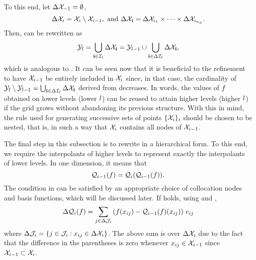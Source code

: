  To this
end, let $\Delta\mathcal{X}_{-1} = \emptyset$,
\[
  \Delta\mathcal{X}_i = \mathcal{X}_i \setminus \mathcal{X}_{i - 1}, \text{ and } \Delta\mathcal{X}_{\mathbf{i}} = \Delta\mathcal{X}_{i_1} \times \cdots \times \Delta\mathcal{X}_{i_{n_\text{d}}}.
\]
Then,  can be rewritten as
\begin{equation} \elab{smolyak-grid-incremental}
  \Y_\l = \bigcup_{\vi \in \lindex_\l} \Delta\X_\vi = \Y_{\l - 1} \cup \bigcup_{\vi \in \Delta\lindex_\l} \Delta\X_\vi,
\end{equation}
which is analogous to . It can be seen now that it is
beneficial to the refinement to have $\mathcal{X}_{i - 1}$ be entirely included in $\mathcal{X}_i$
since, in that case, the cardinality of $\mathcal{Y}_l \setminus \mathcal{Y}_{l - 1} =
\bigcup_{\mathbf{i} \in \Delta\mathcal{I}_l} \Delta\mathcal{X}_{\mathbf{i}}$ derived from
 decreases. In words, the values of $f$ obtained
on lower levels (lower $l$) can be reused to attain higher levels (higher $l$)
if the grid grows without abandoning its previous structure. With this in mind,
the rule used for generating successive sets of points $\{ \mathcal{X}_i \}_i$ should be
chosen to be nested, that is, in such a way that $\mathcal{X}_i$ contains all nodes of
$\mathcal{X}_{i - 1}$.

The final step in this subsection is to rewrite  in a
hierarchical form. To this end, we require the interpolants of higher levels to
represent exactly the interpolants of lower levels. In one dimension, it means
that
\begin{equation} \elab{tensor-exactness}
  \tensor{i - 1}(\f) = \tensor{i}(\tensor{i - 1}(\f)).
\end{equation}
The condition in  can be satisfied by an appropriate
choice of collocation nodes and basis functions, which will be discussed later.
If  holds, using  and
,
\[
  \Delta\mathcal{Q}_{i}(f) = \sum_{j \in \Delta\mathcal{J}_i} \left( f(x_{ij}) - \mathcal{Q}_{i - 1}(f)(x_{ij}) \right) \, e_{ij}
\]
where $\Delta\mathcal{J}_i = \{ j \in \mathcal{J}_i: x_{ij} \in \Delta\mathcal{X}_i \}$. The
above sum is over $\Delta\mathcal{X}_i$ due to the fact that the difference in the
parentheses is zero whenever $x_{ij} \in \mathcal{X}_{i - 1}$ since $\mathcal{X}_{i - 1} \subset
\mathcal{X}_i$.

